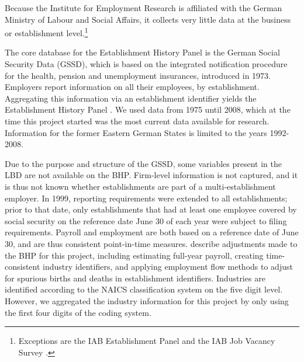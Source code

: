 Because the Institute for Employment Research is affiliated with the German Ministry of Labour and Social Affairs, it collects very little data at the business or establishment level.\footnote{Exceptions are the IAB Establishment Panel \citep{IABEstabPanel} and the IAB Job Vacancy Survey \citep{JVS}.}

The core database for the Establishment History Panel is the German Social Security Data  (GSSD), which is based on the integrated notification procedure for the health, pension and unemployment insurances,   introduced in  1973. Employers report information on all their employees, by establishment. Aggregating this information via an establishment identifier yields the Establishment History Panel \citep[German abbreviation: BHP]{BHP}. We used data from  1975 until 2008, which at the time this project started was the most current data available for research. Information for the former Eastern German States is limited to the years 1992-2008. 

Due to the purpose and structure of the GSSD, some variables present in the \ac{LBD} are not available on the  \ac{BHP}. Firm-level information is not captured, and it is thus not known whether establishments are part of a multi-establishment employer. In 1999, reporting requirements were extended to all establishments; prior to that date, only establishments that  had at least one employee covered by social security on the reference date June 30 of each year were subject to filing requirements. Payroll and employment are both based on a reference date of June 30, and are thus consistent point-in-time measures. 
\citet{SJIAOS-2014b} describe adjustments made to the \ac{BHP} for this project, including estimating full-year payroll, creating time-consistent industry identifiers, and applying employment flow methods \citep{RePEc:iab:iabfme:201006_en} to adjust for spurious births and deaths in establishment identifiers. 
Industries are identified according to the NAICS classification system on the five digit level. However, we aggregated the industry information for this project by only using the first four digits of the coding system.




